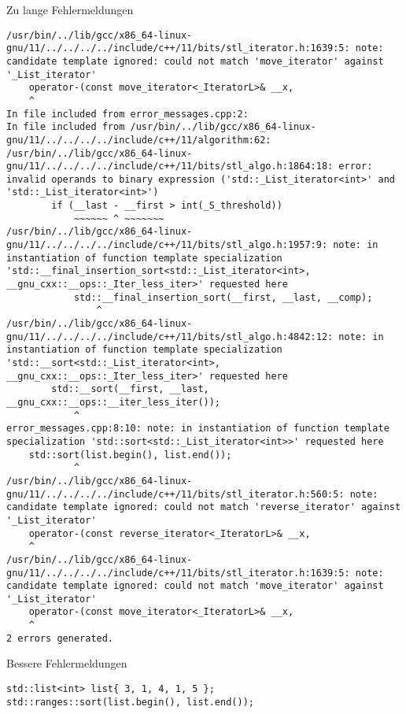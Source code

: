 \begin{frame}{Zu lange Fehlermeldungen}
\begin{verbatim}
/usr/bin/../lib/gcc/x86_64-linux-gnu/11/../../../../include/c++/11/bits/stl_iterator.h:1639:5: note: candidate template ignored: could not match 'move_iterator' against '_List_iterator'
    operator-(const move_iterator<_IteratorL>& __x,
    ^
In file included from error_messages.cpp:2:
In file included from /usr/bin/../lib/gcc/x86_64-linux-gnu/11/../../../../include/c++/11/algorithm:62:
/usr/bin/../lib/gcc/x86_64-linux-gnu/11/../../../../include/c++/11/bits/stl_algo.h:1864:18: error: invalid operands to binary expression ('std::_List_iterator<int>' and 'std::_List_iterator<int>')
        if (__last - __first > int(_S_threshold))
            ~~~~~~ ^ ~~~~~~~
/usr/bin/../lib/gcc/x86_64-linux-gnu/11/../../../../include/c++/11/bits/stl_algo.h:1957:9: note: in instantiation of function template specialization 'std::__final_insertion_sort<std::_List_iterator<int>, __gnu_cxx::__ops::_Iter_less_iter>' requested here
            std::__final_insertion_sort(__first, __last, __comp);
                ^
/usr/bin/../lib/gcc/x86_64-linux-gnu/11/../../../../include/c++/11/bits/stl_algo.h:4842:12: note: in instantiation of function template specialization 'std::__sort<std::_List_iterator<int>, __gnu_cxx::__ops::_Iter_less_iter>' requested here
        std::__sort(__first, __last, __gnu_cxx::__ops::__iter_less_iter());
            ^
error_messages.cpp:8:10: note: in instantiation of function template specialization 'std::sort<std::_List_iterator<int>>' requested here
    std::sort(list.begin(), list.end());
            ^
/usr/bin/../lib/gcc/x86_64-linux-gnu/11/../../../../include/c++/11/bits/stl_iterator.h:560:5: note: candidate template ignored: could not match 'reverse_iterator' against '_List_iterator'
    operator-(const reverse_iterator<_IteratorL>& __x,
    ^
/usr/bin/../lib/gcc/x86_64-linux-gnu/11/../../../../include/c++/11/bits/stl_iterator.h:1639:5: note: candidate template ignored: could not match 'move_iterator' against '_List_iterator'
    operator-(const move_iterator<_IteratorL>& __x,
    ^
2 errors generated.\end{verbatim}

\end{frame}

\begin{frame}[fragile]{Bessere Fehlermeldungen}

    \begin{verbatim}
std::list<int> list{ 3, 1, 4, 1, 5 };
std::ranges::sort(list.begin(), list.end());
    \end{verbatim}
\end{frame}

